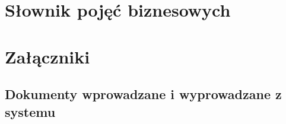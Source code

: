 \documentclass[paper=a4, fontsize=12pt]{scrartcl}
\numberwithin{equation}{section}		%
\numberwithin{figure}{section}			%
\numberwithin{table}{section}				%
\begin{document}




\section{Słownik pojęć biznesowych}
	

\section{Załączniki}
	\subsection{Dokumenty wprowadzane i wyprowadzane z systemu}
			
		
		
				
				
\end{document}
